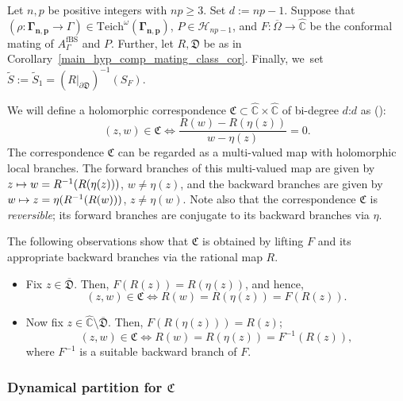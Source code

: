 \documentclass[JEP,XML,SOM,Unicode,NoFloatCountersInSection,published]{cedram}
\def\mto{\mathchoice{\longmapsto}{\mapsto}{\mapsto}{\mapsto}}
\theoremstyle{definition}
\theoremstyle{remark}
\newcommand{\C}{\mathbb{C}}
\begin{document}
Let $n,p$ be positive integers with $np\geq 3$. Set $d:=np-1$. Suppose that $(\rho:\pmb{\Gamma_{n,p}}\to\Gamma)\in\mathrm{Teich}^\omega(\pmb{\Gamma_{n,p}})$, $P\in\mathcal{H}_{np-1}$, and $F:\overline{\Omega}\to\widehat{\C}$ be the conformal mating of $A_{\Gamma}^{\mathrm{fBS}}$ and $P$. Further, let $R, \mathfrak{D}$ be as in Corollary~\ref{main_hyp_comp_mating_class_cor}. Finally, we~set $\widetilde{S}:=\widetilde{S}_1=(R\vert_{\partial\mathfrak{D}})^{-1}(S_F)$.

We will define a holomorphic correspondence $\mathfrak{C}\subset\widehat{\C}\times\widehat{\C}$ of bi-degree $d$:$d$ as (\cf \cite{DS06}):
\begin{equation}
(z,w)\in\mathfrak{C}\iff \frac{R(w)-R(\eta(z))}{w-\eta(z)}=0.
\label{corr_eqn}
\end{equation}
The correspondence $\mathfrak{C}$ can be regarded as a multi-valued map with holomorphic local branches. The forward branches of this multi-valued map are given by $z\mto w=R^{-1}(R(\eta(z)))$, $w\neq \eta(z)$, and the backward branches are given by $w\mto z=\eta(R^{-1}(R(w)))$, $z\neq \eta(w)$. Note also that the correspondence $\mathfrak{C}$ is \emph{reversible}; \ie its forward branches are conjugate to its backward branches via $\eta$.

The following observations show that $\mathfrak{C}$ is obtained by lifting $F$ and its appropriate backward branches via the rational map $R$.
\begin{itemize}
\item Fix $z\in\overline{\mathfrak{D}}$. Then, $F(R(z))=R(\eta(z))$, and hence,
\begin{equation}
(z,w)\in\mathfrak{C} \iff R(w)=R(\eta(z))=F(R(z)).
\label{f_lift_eqn}
\end{equation}

\item Now fix $z\in\widehat{\C}\setminus\overline{\mathfrak{D}}$. Then, $F(R(\eta(z)))=R(z)$; \ie
\begin{equation}
(z,w)\in\mathfrak{C} \iff R(w)=R(\eta(z))=F^{-1}(R(z)),
\label{f_inv_lift_eqn}
\end{equation}
where $F^{-1}$ is a suitable backward branch of $F$.
\end{itemize}

\subsubsection{Dynamical partition for $\mathfrak{C}$}\label{inv_partition_corr_1_subsubsec}
\end{document}
